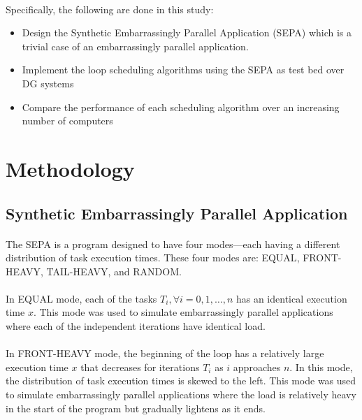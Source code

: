 \documentclass[10pt, twocolumn, letterpaper]{article}
\begin{document}
\paragraph{}
Specifically, the following are done in this study:

\begin{itemize}
	\item{Design the Synthetic Embarrassingly Parallel Application (SEPA) which is a trivial case of an embarrassingly parallel application.}
	\item{Implement the loop scheduling algorithms using the SEPA as test bed over DG systems}
	\item{Compare the performance of each scheduling algorithm over an increasing number of computers}
\end{itemize}

\section{Methodology}

\subsection{Synthetic Embarrassingly Parallel Application}

\paragraph{}
The SEPA is a program designed to have four modes---each having a different distribution of task execution times. These four modes are: \textsf{EQUAL}, \textsf{FRONT-HEAVY}, \textsf{TAIL-HEAVY}, and \textsf{RANDOM}.

\paragraph{}
In \textsf{EQUAL} mode, each of the tasks $T_i, \forall i=0,1,\dots,n$ has an identical execution time $x$. This mode was used to simulate embarrassingly parallel applications where each of the independent iterations have identical load.

\paragraph{}
In \textsf{FRONT-HEAVY} mode, the beginning of the loop has a relatively large execution time $x$ that decreases for iterations $T_i$ as $i$ approaches $n$. In this mode, the distribution of task execution times is skewed to the left. This mode was used to simulate embarrassingly parallel applications where the load is relatively heavy in the start of the program but gradually lightens as it ends.
\end{document}
